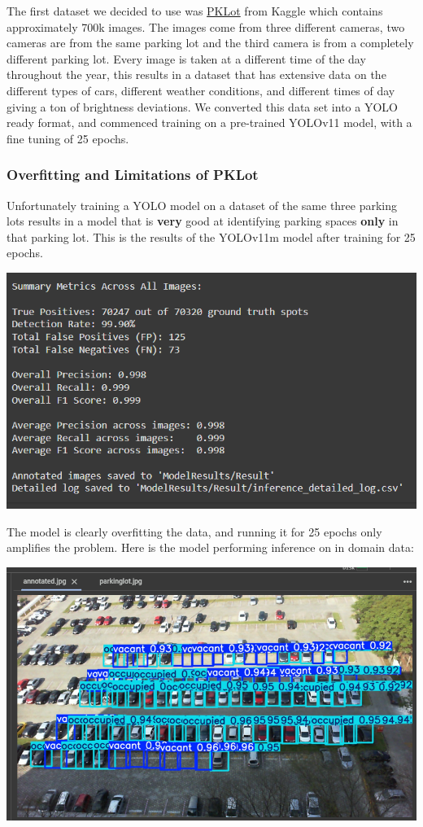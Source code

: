 \documentclass[12pt, letterpaper, oneside]{article}
\begin{document}
The first dataset we decided to use was \href{https://www.kaggle.com/datasets/ammarnassanalhajali/pklot-dataset}{PKLot} from Kaggle which contains approximately 700k images. The images come from three different cameras, two cameras are from the same parking lot and the third camera is from a completely different parking lot. Every image is taken at a different time of the day throughout the year, this results in a dataset that has extensive data on the different types of cars, different weather conditions, and different times of day giving a ton of brightness deviations. We converted this data set into a YOLO ready format, and commenced training on a pre-trained YOLOv11 model, with a fine tuning of 25 epochs.

\subsubsection{Overfitting and Limitations of PKLot}
Unfortunately training a YOLO model on a dataset of the same three parking lots results in a model that is \textbf{very} good at identifying parking spaces \textbf{only} in that parking lot. This is the results of the YOLOv11m model after training for 25 epochs. 

\includegraphics[scale=0.8]{pklot-25epochs-medium-results.png}

The model is clearly overfitting the data, and running it for 25 epochs only amplifies the problem. Here is the model performing inference on in domain data:

\includegraphics[scale=0.5]{report-images/pklot-25epochs-medium-inference.png}
\end{document}
